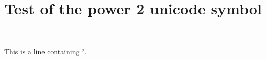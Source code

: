 \documentclass{article}
\title{Test of the power 2 unicode symbol}
\begin{document}
This is a line containing ².
\end{document}

